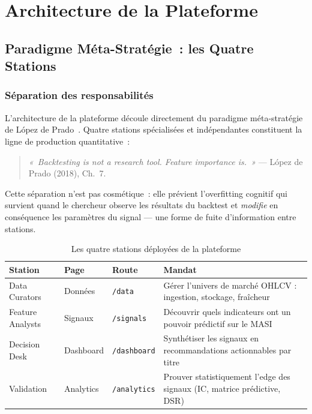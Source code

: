 \chapter{Architecture de la Plateforme}
\label{ch:architecture}

\section{Paradigme Méta-Stratégie~: les Quatre Stations}
\label{sec:quatre_stations}

\subsection{Séparation des responsabilités}

L'architecture de la plateforme découle directement du paradigme méta-stratégie de
López de Prado~\cite{lopezdeprado2018}. Quatre stations spécialisées et indépendantes
constituent la ligne de production quantitative~:

\begin{quote}
\textit{«~Backtesting is not a research tool. Feature importance is.~»}
— López de Prado (2018), Ch.~7.
\end{quote}

Cette séparation n'est pas cosmétique~: elle prévient l'overfitting cognitif qui
survient quand le chercheur observe les résultats du backtest et \emph{modifie} en
conséquence les paramètres du signal — une forme de fuite d'information entre stations.

\begin{table}[H]
\centering
\caption{Les quatre stations déployées de la plateforme}
\label{tab:quatre_stations}
\begin{tabularx}{\linewidth}{@{}lllY@{}}
\toprule
\textbf{Station} & \textbf{Page}    & \textbf{Route}        & \textbf{Mandat} \\
\midrule
Data Curators    & Données          & \texttt{/data}        & Gérer l'univers de marché OHLCV : ingestion, stockage, fraîcheur \\
Feature Analysts & Signaux          & \texttt{/signals}     & Découvrir quels indicateurs ont un pouvoir prédictif sur le MASI \\
Decision Desk    & Dashboard        & \texttt{/dashboard}   & Synthétiser les signaux en recommandations actionnables par titre \\
Validation       & Analytics        & \texttt{/analytics}   & Prouver statistiquement l'edge des signaux (IC, matrice prédictive, DSR) \\
\bottomrule
\end{tabularx}
\end{table}

